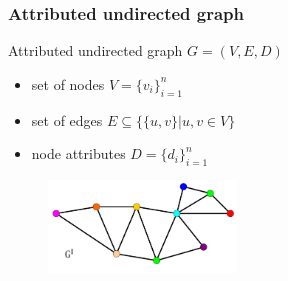 \documentclass[hyperref={pdfpagelabels=false}]{beamer}
\begin{document}
\begin{frame}
\frametitle{Attributed undirected graph}
Attributed undirected graph $G=(V,E,D)$
\begin{itemize}
\item set of nodes $V=\{v_i\}_{i=1}^{n}$
\item set of edges $E\subseteq\{\{u,v\}| u, v\in V\}$
\item node attributes $D=\{d_i\}_{i=1}^{n}$
\end{itemize}
\vspace{1cm}
\begin{figure}[b]
    \centering
    \includegraphics[width=5cm]{fig/at_graph_1.pdf}
\end{figure}%
\end{frame}
\end{document}
